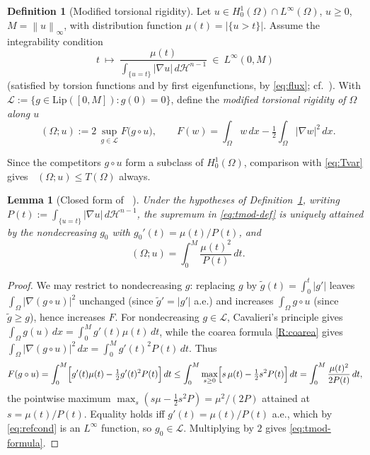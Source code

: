 \documentclass[11pt]{amsart}
\newtheorem{lemma}[theorem]{Lemma}
\theoremstyle{definition}
\newtheorem{definition}[theorem]{Definition}
\newcommand{\Om}{\Omega}
\newcommand{\HH}{\mathcal H}
\newcommand{\abs}[1]{\left|#1\right|}
\newcommand{\norm}[1]{\left\|#1\right\|}
\newcommand{\dx}{\,dx}
\newcommand{\dt}{\,dt}
\newcommand{\dH}{\,d\HH^{n-1}}
\DeclareMathOperator{\Tmod}{T_{\mathrm{mod}}}
\begin{document}
\begin{definition}[Modified torsional rigidity]\label{def:tmod}
Let $u\in H^1_0(\Om)\cap L^\infty(\Om)$, $u\ge0$, $M=\norm u_\infty$, with
distribution function $\mu(t)=\abs{\{u>t\}}$. Assume the integrability
condition
\begin{equation}\label{eq:refcond}
  t\ \longmapsto\ \frac{\mu(t)}{\int_{\{u=t\}}\abs{\nabla u}\dH}\ \in\ L^\infty(0,M)
\end{equation}
(satisfied by torsion functions and by first eigenfunctions, by
\eqref{eq:flux}; cf.~\cite[Lem.~3.2]{Brasco2014}). With
$\mathcal L:=\{g\in\mathrm{Lip}([0,M]):g(0)=0\}$, define the
\emph{modified torsional rigidity of $\Om$ along $u$}
\begin{equation}\label{eq:tmod-def}
  \Tmod(\Om;u):=2\,\sup_{g\in\mathcal L}F\bigl(g\circ u\bigr),
  \qquad F(w)=\int_\Om w\dx-\tfrac12\int_\Om\abs{\nabla w}^2\dx .
\end{equation}
\end{definition}

Since the competitors $g\circ u$ form a subclass of $H^1_0(\Om)$, comparison
with \eqref{eq:Tvar} gives $\Tmod(\Om;u)\le T(\Om)$ always.

\begin{lemma}[Closed form of $\Tmod$]\label{lem:tmod-formula}
Under the hypotheses of Definition~\ref{def:tmod}, writing
$P(t):=\int_{\{u=t\}}\abs{\nabla u}\dH$, the supremum in
\eqref{eq:tmod-def} is uniquely attained by the nondecreasing $g_0$ with
$g_0'(t)=\mu(t)/P(t)$, and
\begin{equation}\label{eq:tmod-formula}
  \Tmod(\Om;u)=\int_0^M\frac{\mu(t)^2}{P(t)}\dt .
\end{equation}
\end{lemma}

\begin{proof}
We may restrict to nondecreasing $g$: replacing $g$ by
$\tilde g(t)=\int_0^t\abs{g'}$ leaves $\int_\Om\abs{\nabla(g\circ u)}^2$
unchanged (since $\tilde g'=\abs{g'}$ a.e.) and increases $\int_\Om g\circ
u$ (since $\tilde g\ge g$), hence increases $F$. For nondecreasing
$g\in\mathcal L$, Cavalieri's principle gives
$\int_\Om g(u)\dx=\int_0^M g'(t)\mu(t)\dt$, while the coarea formula
\ref{R:coarea} gives
$\int_\Om\abs{\nabla(g\circ u)}^2\dx=\int_0^M g'(t)^2 P(t)\dt$. Thus
\[
  F(g\circ u)=\int_0^M\Bigl[g'(t)\mu(t)-\tfrac12 g'(t)^2 P(t)\Bigr]\dt
  \le\int_0^M\max_{s\ge0}\Bigl[s\,\mu(t)-\tfrac12 s^2 P(t)\Bigr]\dt
  =\int_0^M\frac{\mu(t)^2}{2P(t)}\dt,
\]
the pointwise maximum $\max_s(s\mu-\tfrac12 s^2P)=\mu^2/(2P)$ attained at
$s=\mu(t)/P(t)$. Equality holds iff $g'(t)=\mu(t)/P(t)$ a.e., which by
\eqref{eq:refcond} is an $L^\infty$ function, so $g_0\in\mathcal L$.
Multiplying by $2$ gives \eqref{eq:tmod-formula}.
\end{proof}
\end{document}
